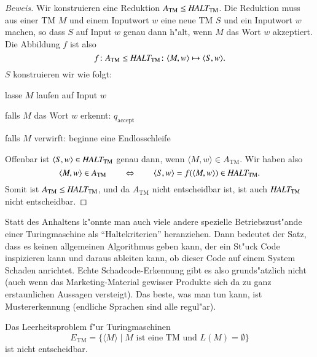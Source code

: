 \begin{proof}[Beweis]
Wir konstruieren eine Reduktion
$
A_{\text{TM}}
\le
\text{\it HALT}_{\text{TM}}
$.
Die Reduktion muss aus einer TM $M$ und einem Inputwort $w$ eine
neue TM $S$ und ein Inputwort $w$ machen, so dass $S$ auf
Input $w$ genau dann h"alt, wenn $M$ das Wort $w$ akzeptiert.
Die Abbildung $f$ ist also
\[
f\colon 
A_{\text{TM}}
\le
\text{\it HALT}_{\text{TM}}
\colon
\langle M,w\rangle\mapsto \langle S,w\rangle.
\]
$S$ konstruieren wir wie folgt:
\medskip
\begin{compactenum}
\item lasse $M$ laufen auf Input $w$
\item falls $M$ das Wort $w$ erkennt: $q_{\text{accept}}$
\item falls $M$ verwirft: beginne eine Endlosschleife
\end{compactenum}
\medskip
Offenbar ist
$\langle S,w\rangle\in \text{\it HALT}_{\text{TM}}$
genau dann, wenn $\langle M,w\rangle\in A_{\text{TM}}$.
Wir haben also
\[
\langle M,w\rangle\in A_{\text{TM}}
\qquad
\Leftrightarrow
\qquad
\langle S,w\rangle=f(\langle M,w\rangle)
\in \text{\it HALT}_{\text{TM}}.
\]
Somit ist 
$A_{\text{TM}}\le\text{\it HALT}_{\text{TM}}$, und da
$A_{\text{TM}}$ nicht entscheidbar ist, ist auch
$\text{\it HALT}_{\text{TM}}$ nicht entscheidbar.
\end{proof}
Statt des Anhaltens k"onnte man auch viele andere spezielle
Betriebszust"ande einer Turingmaschine als ``Haltekriterien''
heranziehen.
Dann bedeutet der Satz, dass es keinen allgemeinen
Algorithmus geben kann, der ein St"uck Code inspizieren kann und
daraus ableiten kann, ob dieser Code auf einem System Schaden
anrichtet.
Echte Schadcode-Erkennung gibt es also grunds"atzlich
nicht (auch wenn das Marketing-Material gewisser Produkte sich
da zu ganz erstaunlichen Aussagen versteigt).
Das beste, was man
tun kann, ist Mustererkennung (endliche Sprachen sind alle regul"ar).

\begin{satz}
%
Das Leerheitsproblem f"ur Turingmaschinen
\[
E_{\text{TM}}
=
\{ \langle M\rangle\;|\; \text{$M$ ist eine TM und $L(M)=\emptyset$}\}
\]
%
ist nicht entscheidbar.
\end{satz}

